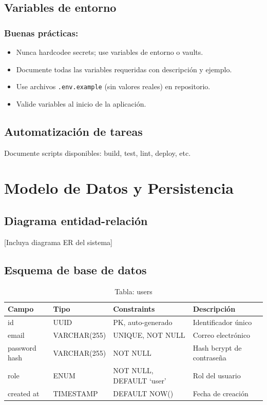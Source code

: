 \documentclass[a4paper,11pt,spanish]{article}
\begin{document}
\subsection{Variables de entorno}

\subsubsection*{Buenas prácticas:}

\begin{itemize}
    \item Nunca hardcodee secrets; use variables de entorno o vaults.
    \item Documente todas las variables requeridas con descripción y ejemplo.
    \item Use archivos \texttt{.env.example} (sin valores reales) en repositorio.
    \item Valide variables al inicio de la aplicación.
\end{itemize}

\subsection{Automatización de tareas}

Documente scripts disponibles: build, test, lint, deploy, etc.

\newpage

\section{Modelo de Datos y Persistencia}

\subsection{Diagrama entidad-relación}

[Incluya diagrama ER del sistema]

\subsection{Esquema de base de datos}

\begin{table}[H]
\centering
\caption{Tabla: users}
\label{tab:users}
\begin{tabular}{@{}llll@{}}
\toprule
\textbf{Campo} & \textbf{Tipo} & \textbf{Constraints} & \textbf{Descripción} \\
\midrule
id & UUID & PK, auto-generado & Identificador único \\
email & VARCHAR(255) & UNIQUE, NOT NULL & Correo electrónico \\
password hash & VARCHAR(255) & NOT NULL & Hash bcrypt de contraseña \\
role & ENUM & NOT NULL, DEFAULT `user' & Rol del usuario \\
created at & TIMESTAMP & DEFAULT NOW() & Fecha de creación \\
\bottomrule
\end{tabular}
\end{table}
\end{document}
